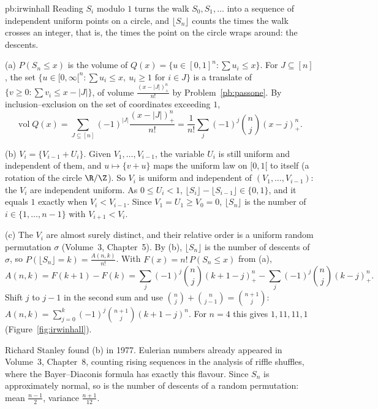 \begin{solution}{pb:irwinhall}
\idea Reading $S_i$ modulo $1$ turns the walk $S_0,S_1,\dots$ into a sequence of independent uniform points on a circle, and $\lfloor S_n\rfloor$
counts the times the walk crosses an integer, that is, the times the point on the circle wraps around: the descents.

\writeup (a) $P(S_n\le x)$ is the volume of $Q(x)=\{u\in[0,1]^n:\sum u_i\le x\}$. For $J\subseteq[n]$, the set $\{u\in[0,\infty[^n:\sum u_i\le x,\ u_i\ge1\text{ for }i\in J\}$ is a
translate of $\{v\ge0:\sum v_i\le x-|J|\}$, of volume $\frac{(x-|J|)_+^n}{n!}$ by Problem~\ref{pb:passone}. By inclusion--exclusion on the set of coordinates
exceeding $1$,
\[
\operatorname{vol}Q(x)=\sum_{J\subseteq[n]}(-1)^{|J|}\frac{(x-|J|)_+^n}{n!}=\frac1{n!}\sum_j(-1)^j\binom nj(x-j)_+^n.
\]

(b) $V_i=\{V_{i-1}+U_i\}$. Given $V_1,\dots,V_{i-1}$, the variable $U_i$ is still uniform and independent of them, and $u\mapsto\{v+u\}$ maps the
uniform law on $[0,1[$ to itself (a rotation of the circle $\R/\Z$). So $V_i$ is uniform and independent of $(V_1,\dots,V_{i-1})$: the $V_i$
are independent uniform. As $0\le U_i<1$, $\lfloor S_i\rfloor-\lfloor S_{i-1}\rfloor\in\{0,1\}$, and it equals $1$ exactly when $V_i<V_{i-1}$. Since $V_1=U_1\ge V_0=0$,
$\lfloor S_n\rfloor$ is the number of $i\in\{1,\dots,n-1\}$ with $V_{i+1}<V_i$.

(c) The $V_i$ are almost surely distinct, and their relative order is a uniform random permutation $\sigma$ (Volume~3, Chapter~5). By (b),
$\lfloor S_n\rfloor$ is the number of descents of $\sigma$, so $P(\lfloor S_n\rfloor=k)=\frac{A(n,k)}{n!}$. With $F(x)=n!\,P(S_n\le x)$ from (a),
\[
A(n,k)=F(k+1)-F(k)=\sum_j(-1)^j\binom nj(k+1-j)^n_+-\sum_j(-1)^j\binom nj(k-j)_+^n.
\]
Shift $j$ to $j-1$ in the second sum and use $\binom nj+\binom n{j-1}=\binom{n+1}j$: $A(n,k)=\sum_{j=0}^k(-1)^j\binom{n+1}j(k+1-j)^n$. For $n=4$ this gives
$1,11,11,1$ (Figure~\ref{fig:irwinhall}).

\leads Richard Stanley found (b) in 1977. Eulerian numbers already appeared in Volume~3, Chapter~8, counting rising sequences in the
analysis of riffle shuffles, where the Bayer--Diaconis formula has exactly this flavour. Since $S_n$ is approximately normal, so is the
number of descents of a random permutation: mean $\frac{n-1}2$, variance $\frac{n+1}{12}$.
\end{solution}

